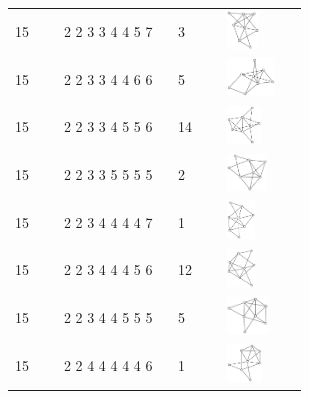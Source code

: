 \begin{table}[h!]
\begin{tabular}{m{0.15\linewidth} m{0.35\linewidth} m{0.15\linewidth} m{0.25\linewidth}}
15 & 2 2 3 3 4 4 5 7 & 3 & \includegraphics[height=1cm]{15-universal-graphs/img/degree-sequences-example-graphs/graph-4-8-111}\\
15 & 2 2 3 3 4 4 6 6 & 5 & \includegraphics[height=1cm]{15-universal-graphs/img/degree-sequences-example-graphs/graph-4-8-112}\\
15 & 2 2 3 3 4 5 5 6 & 14 & \includegraphics[height=1cm]{15-universal-graphs/img/degree-sequences-example-graphs/graph-4-8-113}\\
15 & 2 2 3 3 5 5 5 5 & 2 & \includegraphics[height=1cm]{15-universal-graphs/img/degree-sequences-example-graphs/graph-4-8-114}\\
15 & 2 2 3 4 4 4 4 7 & 1 & \includegraphics[height=1cm]{15-universal-graphs/img/degree-sequences-example-graphs/graph-4-8-115}\\
15 & 2 2 3 4 4 4 5 6 & 12 & \includegraphics[height=1cm]{15-universal-graphs/img/degree-sequences-example-graphs/graph-4-8-116}\\
15 & 2 2 3 4 4 5 5 5 & 5 & \includegraphics[height=1cm]{15-universal-graphs/img/degree-sequences-example-graphs/graph-4-8-117}\\
15 & 2 2 4 4 4 4 4 6 & 1 & \includegraphics[height=1cm]{15-universal-graphs/img/degree-sequences-example-graphs/graph-4-8-118}\\

\end{tabular}
\end{table}
